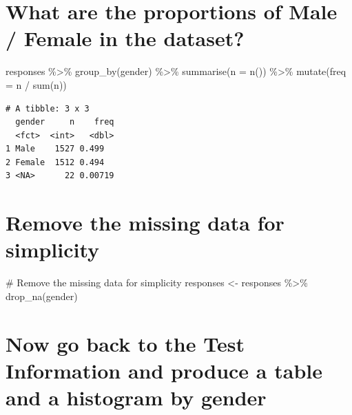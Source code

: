 \documentclass[
  letterpaper,
  DIV=11,
  numbers=noendperiod]{scrreprt}
\newenvironment{Shaded}{\begin{snugshade}}{\end{snugshade}}
\newcommand{\AttributeTok}[1]{\textcolor[rgb]{0.40,0.45,0.13}{#1}}
\newcommand{\CommentTok}[1]{\textcolor[rgb]{0.37,0.37,0.37}{#1}}
\newcommand{\FunctionTok}[1]{\textcolor[rgb]{0.28,0.35,0.67}{#1}}
\newcommand{\NormalTok}[1]{\textcolor[rgb]{0.00,0.23,0.31}{#1}}
\newcommand{\OtherTok}[1]{\textcolor[rgb]{0.00,0.23,0.31}{#1}}
\newcommand{\SpecialCharTok}[1]{\textcolor[rgb]{0.37,0.37,0.37}{#1}}
\begin{document}
\hypertarget{what-are-the-proportions-of-male-female-in-the-dataset}{%
\section{What are the proportions of Male / Female in the
dataset?}\label{what-are-the-proportions-of-male-female-in-the-dataset}}

\begin{Shaded}
\begin{Highlighting}[]
\NormalTok{responses }\SpecialCharTok{\%\textgreater{}\%}
  \FunctionTok{group\_by}\NormalTok{(gender) }\SpecialCharTok{\%\textgreater{}\%}
  \FunctionTok{summarise}\NormalTok{(}\AttributeTok{n =} \FunctionTok{n}\NormalTok{()) }\SpecialCharTok{\%\textgreater{}\%}
  \FunctionTok{mutate}\NormalTok{(}\AttributeTok{freq =}\NormalTok{ n }\SpecialCharTok{/} \FunctionTok{sum}\NormalTok{(n))}
\end{Highlighting}
\end{Shaded}

\begin{verbatim}
# A tibble: 3 x 3
  gender     n    freq
  <fct>  <int>   <dbl>
1 Male    1527 0.499  
2 Female  1512 0.494  
3 <NA>      22 0.00719
\end{verbatim}

\hypertarget{remove-the-missing-data-for-simplicity}{%
\section{Remove the missing data for
simplicity}\label{remove-the-missing-data-for-simplicity}}

\begin{Shaded}
\begin{Highlighting}[]
\CommentTok{\# Remove the missing data for simplicity}
\NormalTok{responses }\OtherTok{\textless{}{-}}\NormalTok{ responses }\SpecialCharTok{\%\textgreater{}\%} \FunctionTok{drop\_na}\NormalTok{(gender)}
\end{Highlighting}
\end{Shaded}

\hypertarget{now-go-back-to-the-test-information-and-produce-a-table-and-a-histogram-by-gender}{%
\section{Now go back to the Test Information and produce a table and a
histogram by
gender}\label{now-go-back-to-the-test-information-and-produce-a-table-and-a-histogram-by-gender}}
\end{document}
